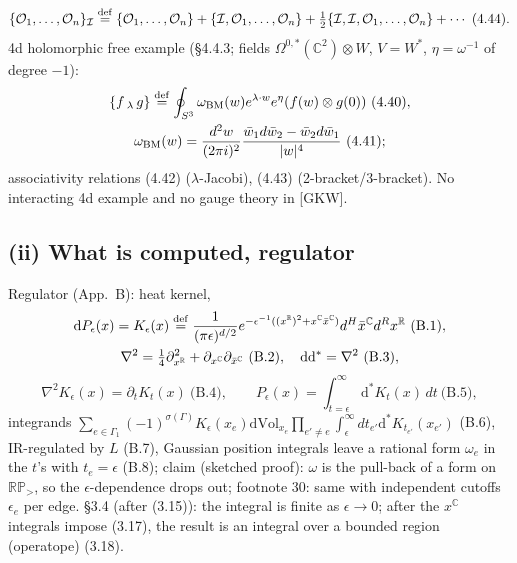 \documentclass[10pt]{article}
\begin{document}
\begin{equation*}
\{\mathcal O_1,\dots,\mathcal O_n\}_{\mathcal I}\overset{\rm def}{=}\{\mathcal O_1,\dots,\mathcal O_n\}+\{\mathcal I,\mathcal O_1,\dots,\mathcal O_n\}+\tfrac12\{\mathcal I,\mathcal I,\mathcal O_1,\dots,\mathcal O_n\}+\cdots\ \text{(4.44)}.
\end{equation*}
4d holomorphic free example (\S4.4.3; fields $\Omega^{0,*}(\mathbb C^2)\otimes W$, $V=W^*$, $\eta=\omega^{-1}$ of degree $-1$):
\begin{gather*}
\{f\,{}_\lambda\,g\}\overset{\rm def}{=}\oint_{S^3}\omega_{\rm BM}(w)e^{\lambda\cdot w}e^\eta(f(w)\otimes g(0))\ \text{(4.40)},\\
\omega_{\rm BM}(w)=\frac{d^2w}{(2\pi i)^2}\frac{\bar w_1d\bar w_2-\bar w_2d\bar w_1}{|w|^4}\ \text{(4.41)};
\end{gather*}
associativity relations (4.42) ($\lambda$-Jacobi), (4.43) (2-bracket/3-bracket). No interacting 4d example and no gauge theory in [GKW].

\subsection{(ii) What is computed, regulator}
Regulator (App.~B): heat kernel,
\begin{gather*}
\mathrm dP_\epsilon(x)=K_\epsilon(x)\overset{\rm def}{=}\frac1{(\pi\epsilon)^{d/2}}e^{-\epsilon^{-1}((x^{\mathbb R})^2+x^{\mathbb C}\bar x^{\mathbb C})}d^H\bar x^{\mathbb C}d^Rx^{\mathbb R}\ \text{(B.1)},\\
\nabla^2=\tfrac14\partial^2_{x^{\mathbb R}}+\partial_{x^{\mathbb C}}\partial_{\bar x^{\mathbb C}}\ \text{(B.2)},\quad \mathrm d\mathrm d^*=\nabla^2\ \text{(B.3)},
\end{gather*}
\begin{equation*}
\nabla^2K_\epsilon(x)=\partial_tK_t(x)\ \text{(B.4)},\qquad P_\epsilon(x)=\int_{t=\epsilon}^\infty\mathrm d^*K_t(x)\,dt\ \text{(B.5)},
\end{equation*}
integrands $\sum_{e\in\Gamma_1}(-1)^{\sigma(\Gamma)}K_\epsilon(x_e)\mathrm{dVol}_{x_e}\prod_{e'\neq e}\int_\epsilon^\infty dt_{e'}\mathrm d^*K_{t_{e'}}(x_{e'})$ (B.6), IR-regulated by $L$ (B.7), Gaussian position integrals leave a rational form $\omega_e$ in the $t$'s with $t_e=\epsilon$ (B.8); claim (sketched proof): $\omega$ is the pull-back of a form on $\mathbb{RP}_>$, so the $\epsilon$-dependence drops out; footnote 30: same with independent cutoffs $\epsilon_e$ per edge. \S3.4 (after (3.15)): the integral is finite as $\epsilon\to0$; after the $x^{\mathbb C}$ integrals impose (3.17), the result is an integral over a bounded region (operatope) (3.18).
\end{document}
